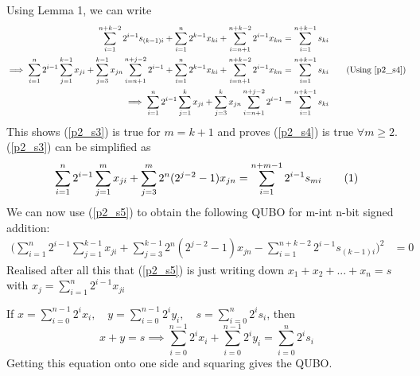 \documentclass[12pt]{article}
\newcommand\numberthis{\addtocounter{equation}{1}\tag{\theequation}}
\begin{document}
Using Lemma 1, we can write
\begin{align*}
    \sum_{i=1}^{n+k-2}2^{i-1}s_{(k-1)i} + \sum_{i=1}^n2^{k-1}x_{ki} + \sum_{i=n+1}^{n+k-2}2^{i-1}x_{kn} &= \sum_{i=1}^{n+k-1}s_{ki}\\
    \implies \sum_{i=1}^{n}2^{i-1}\sum_{j=1}^{k-1}x_{ji} + \sum_{j=3}^{k-1}x_{jn}\sum_{i=n+1}^{n+j-2}2^{i-1} + \sum_{i=1}^n2^{k-1}x_{ki} + \sum_{i=n+1}^{n+k-2}2^{i-1}x_{kn} &= \sum_{i=1}^{n+k-1}s_{ki} \tag{Using \ref{p2_s4}}\\
    \implies \sum_{i=1}^{n}2^{i-1}\sum_{j=1}^{k}x_{ji} + \sum_{j=3}^{k}x_{jn}\sum_{i=n+1}^{n+j-2}2^{i-1} &= \sum_{i=1}^{n+k-1}s_{ki} 
\end{align*}
This shows (\ref{p2_s3}) is true for $m=k+1$ and proves (\ref{p2_s4}) is true $\forall m\geq2.$\\
(\ref{p2_s3}) can be simplified as 
\begin{align*}
    \sum_{i=1}^{n}2^{i-1}\sum_{j=1}^{m}x_{ji} + \sum_{j=3}^{m}2^n(2^{j-2}-1)x_{jn}
    = \sum_{i=1}^{n+m-1}2^{i-1}s_{mi} \numberthis{} \label{p2_s5}
\end{align*}
We can now use (\ref{p2_s5}) to obtain the following QUBO for m-int n-bit signed addition:
\begin{align*}
    \bigg(\sum_{i=1}^{n}2^{i-1}\sum_{j=1}^{k-1}x_{ji} + \sum_{j=3}^{k-1}2^n(2^{j-2}-1)x_{jn}
    - \sum_{i=1}^{n+k-2}2^{i-1}s_{(k-1)i}\bigg)^2 &= 0
\end{align*}
Realised after all this that (\ref{p2_s5}) is just writing down $x_1+x_2+...+x_n=s$ with $x_j=\sum_{i=1}^{n}2^{i-1}x_{ji}$

If $x=\sum_{i=0}^{n-1}2^{i}x_i,\quad y=\sum_{i=0}^{n-1}2^{i}y_i,\quad s=\sum_{i=0}^{n}2^{i}s_i$, then
$$x+y=s \implies \sum_{i=0}^{n-1}2^{i}x_i+\sum_{i=0}^{n-1}2^{i}y_i = \sum_{i=0}^{n}2^{i}s_i$$
Getting this equation onto one side and squaring gives the QUBO.
\end{document}
